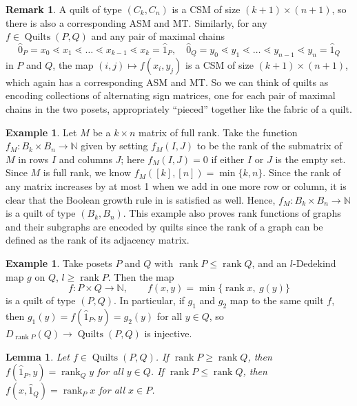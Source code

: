 \documentclass[12pt]{amsart}
\newcommand{\N}{{\mathbb N}}
\numberwithin{equation}{section}
\newtheorem{lemma}[theorem]{Lemma}
\theoremstyle{definition}
\newtheorem{remark}[theorem]{Remark}
\newtheorem{example}[theorem]{Example}
\newcommand{\quilt}{\operatorname{Quilts}}
\newcommand{\rank}{\operatorname{rank}}
\begin{document}
\begin{remark}\label{rem:ASMquiltname}
A quilt of type $(C_k, C_n)$ is a CSM of size $(k+1) \times (n+1)$, so there
is also a corresponding ASM and MT. Similarly, for any $f \in
\quilt(P,Q)$ and any pair of maximal chains
$$\hat 0_P = x_0 \lessdot x_1 \lessdot \dots \lessdot x_{k-1} \lessdot
x_k = \hat 1_P, \quad \hat 0_Q = y_0 \lessdot y_1 \lessdot \dots
\lessdot y_{n-1} \lessdot y_n = \hat 1_Q$$ in $P$ and $Q$, the map
$(i,j) \mapsto f(x_i,y_j)$ is a CSM of size $(k+1) \times (n+1)$, which again
has a corresponding ASM and MT.  So we can think of quilts as encoding
collections of alternating sign matrices, one for each pair of maximal
chains in the two posets, appropriately ``pieced'' together like the
fabric of a quilt.
\end{remark}


\begin{example}\label{ex:all.minors.quil}
Let $M$ be a $k \times n$ matrix of full rank.  Take the function
$f_{M}:B_{k} \times B_{n} \longrightarrow \mathbb{N}$ given by setting
$f_{M}(I,J)$ to be the rank of the submatrix of $M$ in rows $I$ and
columns $J$; here $f_{M}(I,J)=0$ if either $I$ or $J$ is the empty
set.  Since $M$ is full rank, we know $f_{M}([k],[n])=\min\{k,n\}$.
Since the rank of any matrix increases by at most 1 when we add in one
more row or column, it is clear that the Boolean growth rule in
 is satisfied as well.  Hence, $f_{M}:B_{k} \times
B_{n} \longrightarrow \mathbb{N}$ is a quilt of type $(B_{k}, B_{n})$.
This example also proves rank functions of graphs and their subgraphs
are encoded by quilts since the rank of a graph can be defined as the
rank of its adjacency matrix.
\end{example}

\begin{example} \label{ex:dedekindtoquilt}
Take posets $P$ and $Q$ with $\rank P \leq \rank Q$, and an $l$-Dedekind map $g$ on $Q$, $l \geq \rank P$. Then the map
$$f \colon P \times Q \longrightarrow \N, \qquad f(x,y) = \min\{\rank
x,\ g(y)\}$$ is a quilt of type $(P,Q)$. In particular, if $g_1$ and
$g_2$ map to the same quilt $f$, then $g_1(y) = f(\hat 1_P,y) =
g_2(y)$ for all $y \in Q$, so $D_{\rank P}(Q) \longrightarrow
\quilt(P,Q)$ is injective.

\end{example}


\begin{lemma}\label{lem:chains.bounds}
Let $f \in \quilt(P,Q)$.  If $\rank P \geq \rank Q$, then $f(\hat 1_P,y) = \rank_{Q}
y$ for all $y \in Q$.  If $\rank P \leq \rank Q$, then $f(x, \hat 1_{Q}) = \rank_{P} x$ for all $x \in P$.
\end{lemma}
\end{document}
